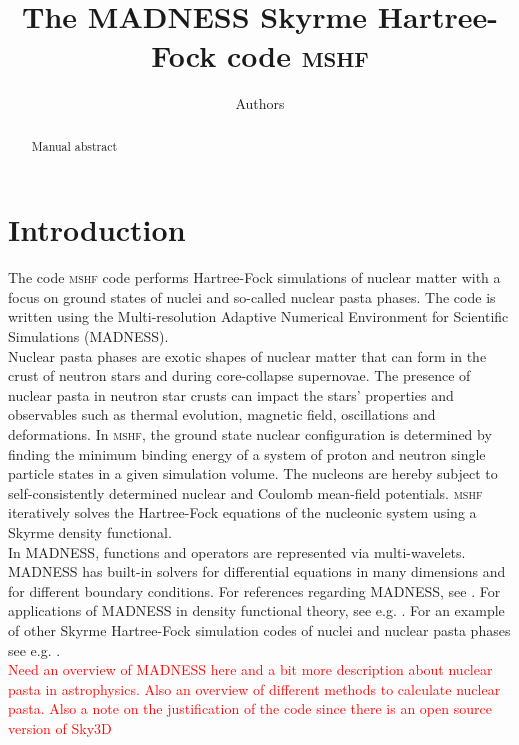 \documentclass[3p]{elsarticle}
\begin{document}
\begin{frontmatter}

\title{The \textsc{MADNESS} Skyrme Hartree-Fock code \textsc{mshf}}

\author{Authors}
\address{Affiliations}

\begin{abstract}
Manual abstract
\end{abstract}


\end{frontmatter}

\linenumbers

\section{Introduction}
The code \textsc{mshf} code performs Hartree-Fock simulations of nuclear matter with a focus on ground states of nuclei and so-called nuclear pasta phases. The code is written using the Multi-resolution Adaptive Numerical Environment for Scientific Simulations (\textsc{MADNESS}).\\
Nuclear pasta phases are exotic shapes of nuclear matter that can form in the crust of neutron stars and during core-collapse supernovae. The presence of nuclear pasta in neutron star crusts can impact the stars' properties and observables such as thermal evolution, magnetic field, oscillations and deformations. In \textsc{mshf}, the ground state nuclear configuration is determined by finding the minimum binding energy of a system of proton and neutron single particle states in a given simulation volume. The nucleons are hereby subject to self-consistently determined nuclear and Coulomb mean-field potentials. \textsc{mshf} iteratively solves the Hartree-Fock equations of the nucleonic system using a Skyrme density functional. \\
In MADNESS, functions and operators are represented via multi-wavelets. MADNESS has built-in solvers for differential equations in many dimensions and for different boundary conditions. For references regarding MADNESS, see \cite{Harrison15, Harrison05, Harrison04, Fann10, Fann09}. For applications of MADNESS in density functional theory, see e.g. \cite{Pei12, Pei14}. For an example of other Skyrme Hartree-Fock simulation codes of nuclei and nuclear pasta phases see e.g. \cite{Maruhn14}.  \\
\textcolor{red}{Need an overview of MADNESS here and a bit more description about nuclear pasta in astrophysics. Also an overview of different methods to calculate nuclear pasta. Also a note on the justification of the code since there is an open source version of Sky3D}
\end{document}
